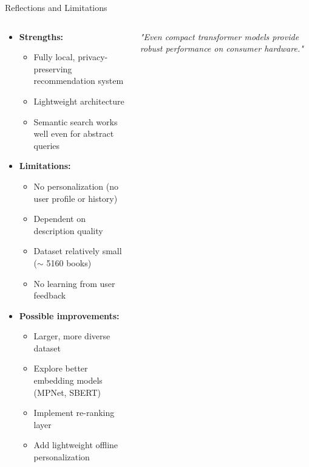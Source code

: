 \begin{frame}{Reflections and Limitations}

\begin{columns}[T]
  \begin{column}{0.40\textwidth}
    \begin{itemize}
        \item \textbf{Strengths:}
          \begin{itemize}
            \item Fully local, privacy-preserving recommendation system
            \item Lightweight architecture
            \item Semantic search works well even for abstract queries
          \end{itemize}
        \item \textbf{Limitations:}
          \begin{itemize}
            \item No personalization (no user profile or history)
            \item Dependent on description quality
            \item Dataset relatively small ($\sim$ 5160 books)
            \item No learning from user feedback
          \end{itemize}
        \item \textbf{Possible improvements:}
          \begin{itemize}
            \item Larger, more diverse dataset
            \item Explore better embedding models (MPNet, SBERT)
            \item Implement re-ranking layer
            \item Add lightweight offline personalization
          \end{itemize}
    \end{itemize}
  \end{column}

  \begin{column}{0.55\textwidth}
    \centering
    \vspace{2cm}
    {\Large\textit{"Even compact transformer models provide robust performance on consumer hardware."}}
  \end{column}
\end{columns}

\end{frame}
